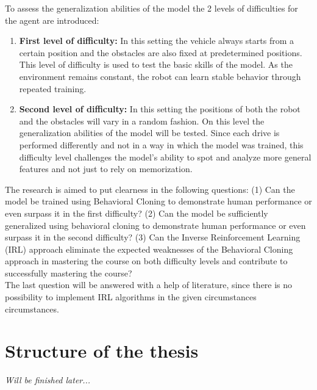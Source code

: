 To assess the generalization abilities of the model the 2 levels of difficulties for the agent are introduced:
\begin{enumerate}
  \item \textbf{First level of difficulty:} In this setting the vehicle always starts from a certain position and the obstacles are also fixed at predetermined positions. This level of difficulty is used to test the basic skills of the model. As the environment remains constant, the robot can learn stable behavior through repeated training.
  \item \textbf{Second level of difficulty:} In this setting the positions of both the robot and the obstacles will vary in a random fashion. On this level the generalization abilities of the model will be tested. Since each drive is performed differently and not in a way in which the model was trained, this difficulty level challenges the model's ability to spot and analyze more general features and not just to rely on memorization.
\end{enumerate}

The research is aimed to put clearness in the following questions: (1) Can the model be trained using Behavioral Cloning \autocite{5152385} to demonstrate human performance or even surpass it in the first difficulty? (2) Can the model be sufficiently generalized using behavioral cloning to demonstrate human performance or even surpass it in the second difficulty? (3) Can the Inverse Reinforcement Learning (IRL) \autocite{ng2000algorithms} \autocite{neu2012apprenticeshiplearningusinginverse} \autocites{lee2021approximateinversereinforcementlearning} approach eliminate the expected weaknesses of the Behavioral Cloning approach in mastering the course on both difficulty levels and contribute to successfully mastering the course? \\
The last question will be answered with a help of literature, since there is no possibility to implement IRL algorithms in the given circumstances circumstances.

\section{Structure of the thesis}
\textit{Will be finished later...}
